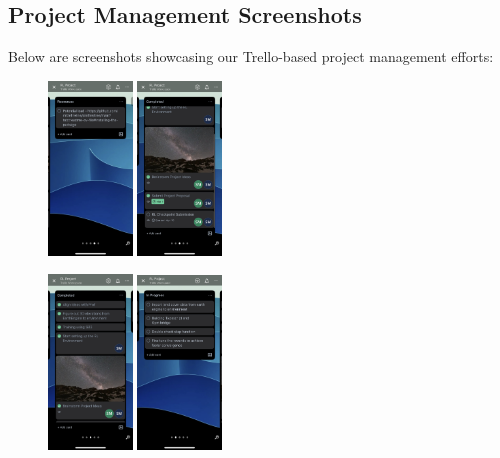 \documentclass[conference]{IEEEtran}
\begin{document}
\subsection{Project Management Screenshots}
Below are screenshots showcasing our Trello-based project management efforts:

\begin{figure}[H]
\centering
\includegraphics[width=0.2\textwidth]{1.jpg}
\includegraphics[width=0.2\textwidth]{2.jpg}
\end{figure}
\vspace{-0.7cm}
\begin{figure}[H]
\centering
\includegraphics[width=0.2\textwidth]{3.jpg}
\includegraphics[width=0.2\textwidth]{4.jpg}
\end{figure}
\end{document}
